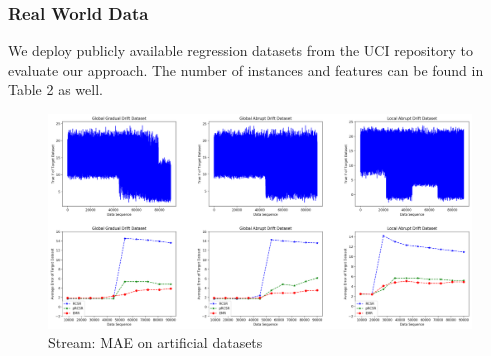 \documentclass[conference,compsoc]{IEEEtran}
\begin{document}
\subsubsection{Real World Data}
We deploy publicly available regression datasets from the UCI repository \cite{liang2015}  to evaluate our approach. The number of instances and features can be found in Table 2 as well.

\begin{figure} [h]
\centering
\includegraphics{fig_streamview_artificial.eps}
\caption{Stream: MAE on artificial datasets}
\label{fig:stream}
\end{figure}
\end{document}
